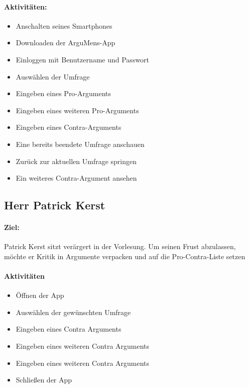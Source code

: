 \paragraph{Aktivitäten:}
\begin{itemize}
\item Anschalten seines Smartphones
\item Downloaden der ArguMens-App 
\item Einloggen mit Benutzername und Passwort
\item Auswählen der Umfrage
\item Eingeben eines Pro-Arguments
\item Eingeben eines weiteren Pro-Arguments
\item Eingeben eines Contra-Arguments
\item Eine bereits beendete Umfrage anschauen
\item Zurück zur aktuellen Umfrage springen
\item Ein weiteres Contra-Argument ansehen
\end{itemize}

\subsection{Herr Patrick Kerst}

\paragraph{Ziel:} Patrick Kerst sitzt verärgert in der Vorlesung. Um seinen Frust abzulassen, möchte er Kritik in Argumente verpacken und auf die Pro-Contra-Liste setzen

\paragraph{Aktivitäten}
\begin{itemize}
\item Öffnen der App
\item Auswählen der gewünschten Umfrage
\item Eingeben eines Contra Arguments 
\item Eingeben eines weiteren Contra Arguments 
\item Eingeben eines weiteren Contra Arguments
\item Schließen der App 
\end{itemize}

\clearpage